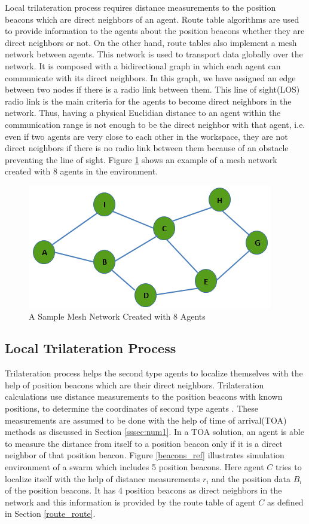 Local trilateration process requires distance measurements to the position beacons which are direct neighbors of an agent. Route table algorithms are used to provide information to the agents about the position beacons whether they are direct neighbors or not. On the other hand, route tables also implement a mesh network between agents. This network is used to transport data globally over the network. It is composed with a bidirectional graph in which each agent can communicate with its direct neighbors. In this graph, we have assigned an edge between two nodes if there is a radio link between them. This line of sight(LOS) radio link is the main criteria for the agents to become direct neighbors in the network. Thus, having a physical Euclidian distance to an agent within the communication range is not enough to be the direct neighbor with that agent, i.e. even if two agents are very close to each other in the workspace, they are not direct neighbors if there is no radio link between them because of an obstacle preventing the line of sight. Figure \ref{sample_mesh} shows an example of a mesh network created with 8 agents in the environment.

\begin{figure}[H]
\caption{A Sample Mesh Network Created with 8 Agents} \label{sample_mesh}
\centering
\includegraphics[scale = 0.58]{mesh}
\end{figure}
 
\subsection{Local Trilateration Process}
Trilateration process helps the second type agents to localize themselves with the help of position beacons which are their direct neighbors.  Trilateration calculations use distance measurements to the position beacons with known positions, to determine the coordinates of second type agents \cite{22}. These measurements are assumed to be done with the help of time of arrival(TOA) methods as discussed in Section \ref{sssec:num1}. In a TOA solution, an agent is able to measure the distance from itself to a position beacon only if it is a direct neighbor of that position beacon. Figure \ref{beacons_ref} illustrates simulation environment of a swarm which includes 5 position beacons. Here agent $C$ tries to localize itself with the help of distance measurements $r_i$ and the position data $B_i$ of the position beacons. It has 4 position beacons as direct neighbors in the network and this information is provided by the route table of agent $C$ as defined in Section \ref{route_route}.

